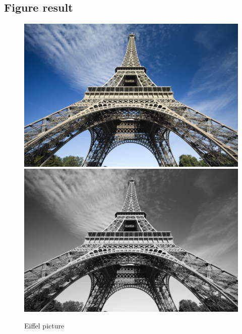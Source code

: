 \documentclass{article}
\begin{document}
\subsection{Figure result}
\begin{figure}
        \includegraphics[width=\textwidth]{./labwork/data/eiffel.jpg}
        \includegraphics[width=\textwidth]{./labwork4-gpu-out.jpg}
        \caption{Eiffel picture}
\end{figure}
\end{document}
